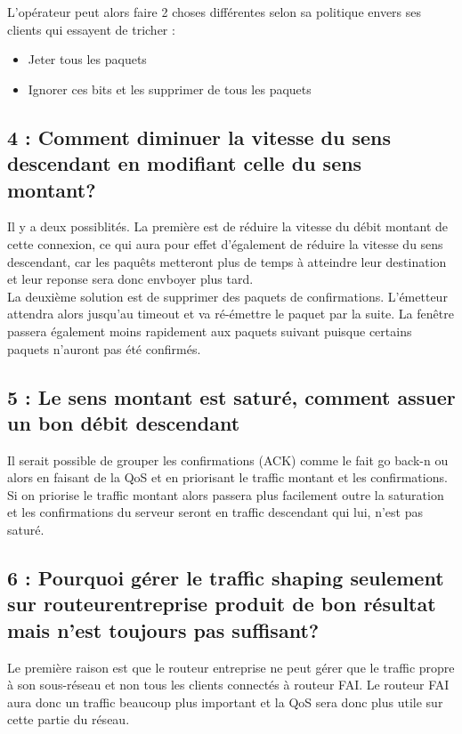 \documentclass{article}
\begin{document}
L'opérateur peut alors faire 2 choses différentes selon sa politique envers ses clients qui essayent de tricher : 

\begin{itemize}
 	\item Jeter tous les paquets
 	\item Ignorer ces bits et les supprimer de tous les paquets
\end{itemize}

\subsection*{4 : Comment diminuer la vitesse du sens descendant en modifiant celle du sens montant?}

Il y a deux possiblités. La première est de réduire la vitesse du débit montant de cette connexion, ce qui aura pour effet d'également de réduire la vitesse du sens descendant, car les paquêts metteront plus de temps à atteindre leur destination et leur reponse sera donc envboyer plus tard.\\

La deuxième solution  est de supprimer des paquets de confirmations. L'émetteur attendra alors jusqu'au timeout et va ré-émettre le paquet par la suite. La fenêtre passera également moins rapidement aux paquets suivant puisque certains paquets n'auront pas été confirmés.

\subsection*{5 : Le sens montant est saturé, comment assuer un bon débit descendant}

Il serait possible de grouper les confirmations (ACK) comme le fait go back-n\cite{GoBackN} ou alors en faisant de la QoS et en priorisant le traffic montant et les confirmations.\\

Si on priorise le traffic montant alors passera plus facilement outre la saturation et les confirmations du serveur seront en traffic descendant qui lui, n'est pas saturé.


\subsection*{6 : Pourquoi gérer le traffic shaping seulement sur routeurentreprise produit de bon résultat mais n'est toujours pas suffisant?}

Le première raison est que le routeur entreprise ne peut gérer que le traffic propre à son sous-réseau et non tous les clients connectés à routeur FAI. Le routeur FAI aura donc un traffic beaucoup plus important et la QoS sera donc plus utile sur cette partie du réseau.\\
\end{document}
